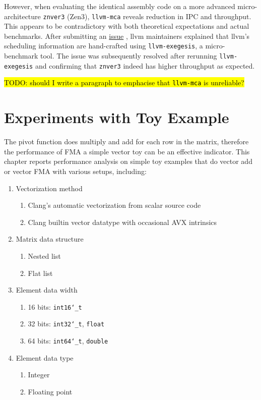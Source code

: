 \documentclass[logo,bsc,singlespacing,parskip]{infthesis}
\newcommand{\dtshort}{\texttt{int16\char`_t}}
\newcommand{\dtint}{\texttt{int32\char`_t}}
\newcommand{\dtlong}{\texttt{int64\char`_t}}
\newcommand{\dtfloat}{\texttt{float}}
\newcommand{\dtdouble}{\texttt{double}}
\newcommand{\mca}{\texttt{llvm-mca}}
\newcommand{\exegesis}{\texttt{llvm-exegesis}}
\newenvironment{compactlist}
{ \begin{enumerate}
    \setlength{\itemsep}{0pt}
    \setlength{\parskip}{0pt}
    \setlength{\parsep}{0pt}     
}
{ \end{enumerate} }
\begin{document}

However, when evaluating the identical assembly code on a more advanced
micro-architecture \texttt{znver3} (Zen3), \mca{} reveals reduction in IPC and
throughput. This appears to be contradictory with both theoretical expectations
and actual benchmarks. After submitting an
\href{https://github.com/llvm/llvm-project/issues/59325}{issue}
\cite{mca-issue}, llvm maintainers explained that llvm's scheduling information
are hand-crafted using \exegesis{}, a micro-benchmark tool. The issue was
subsequently resolved after rerunning \exegesis{} and confirming that
\texttt{znver3} indeed has higher throughput as expected. 

\hl{TODO: should I
write a paragraph to emphacise that \mca{} is unreliable?}

\chapter{Experiments with Toy Example}
\label{sec:Toy}

The pivot function does multiply and add for each row in the matrix, therefore
the performance of FMA a simple vector toy can be an effective indicator. This
chapter reports performance analysis on simple toy examples that do vector add
or vector FMA with various setups, including: 

\begin{enumerate} 
    \item Vectorization method 
        \begin{compactlist} 
            \item Clang's automatic vectorization from scalar source code
            \item Clang builtin vector datatype with occasional AVX intrinsics 
        \end{compactlist}
    \item Matrix data structure 
        \begin{compactlist} 
            \item Nested list
            \item Flat list
        \end{compactlist}
    \item Element data width
        \begin{compactlist} 
            \item 16 bits: \dtshort{}
            \item 32 bits: \dtint{}, \dtfloat{}
            \item 64 bits: \dtlong{}, \dtdouble{}
        \end{compactlist}
    \item Element data type 
        \begin{compactlist} 
            \item Integer
            \item Floating point
        \end{compactlist}
\end{enumerate}
\end{document}
